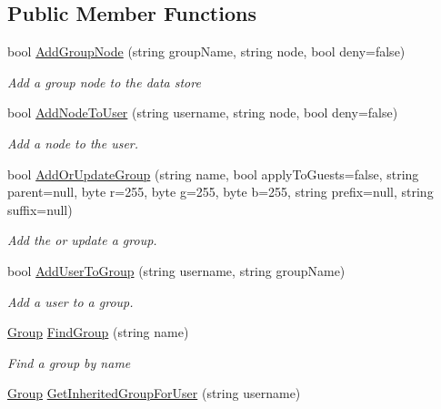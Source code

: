 \subsection*{Public Member Functions}
\begin{DoxyCompactItemize}
\item 
bool \hyperlink{interfaceOTA_1_1Data_1_1IPermissionHandler_a1ece49a5411ae2f2d49dfa9d2c0b5a48}{Add\+Group\+Node} (string group\+Name, string node, bool deny=false)
\begin{DoxyCompactList}\small\item\em Add a group node to the data store \end{DoxyCompactList}\item 
bool \hyperlink{interfaceOTA_1_1Data_1_1IPermissionHandler_a4e079eedf32612c823b06fb0887516d3}{Add\+Node\+To\+User} (string username, string node, bool deny=false)
\begin{DoxyCompactList}\small\item\em Add a node to the user. \end{DoxyCompactList}\item 
bool \hyperlink{interfaceOTA_1_1Data_1_1IPermissionHandler_ac2d924bb7019d02b40c7037c623ca059}{Add\+Or\+Update\+Group} (string name, bool apply\+To\+Guests=false, string parent=null, byte r=255, byte g=255, byte b=255, string prefix=null, string suffix=null)
\begin{DoxyCompactList}\small\item\em Add the or update a group. \end{DoxyCompactList}\item 
bool \hyperlink{interfaceOTA_1_1Data_1_1IPermissionHandler_a3f10bd7f2a21ca4a54acdba9c9f5ba9c}{Add\+User\+To\+Group} (string username, string group\+Name)
\begin{DoxyCompactList}\small\item\em Add a user to a group. \end{DoxyCompactList}\item 
\hyperlink{classOTA_1_1Data_1_1Group}{Group} \hyperlink{interfaceOTA_1_1Data_1_1IPermissionHandler_a3e360ccdb8263bd35a4b19c2e72f4129}{Find\+Group} (string name)
\begin{DoxyCompactList}\small\item\em Find a group by name \end{DoxyCompactList}\item 
\hyperlink{classOTA_1_1Data_1_1Group}{Group} \hyperlink{interfaceOTA_1_1Data_1_1IPermissionHandler_a34c10db72aca4b0ff694afd548d8e673}{Get\+Inherited\+Group\+For\+User} (string username)

\end{DoxyCompactItemize}
